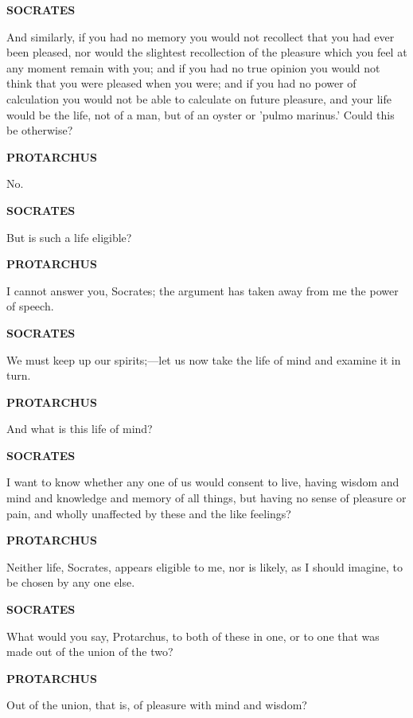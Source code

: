 \documentclass[11pt,letter]{article}
\begin{document}
\par \textbf{SOCRATES}
\par   And similarly, if you had no memory you would not recollect that you had ever been pleased, nor would the slightest recollection of the pleasure which you feel at any moment remain with you; and if you had no true opinion you would not think that you were pleased when you were; and if you had no power of calculation you would not be able to calculate on future pleasure, and your life would be the life, not of a man, but of an oyster or 'pulmo marinus.' Could this be otherwise?

\par \textbf{PROTARCHUS}
\par   No.

\par \textbf{SOCRATES}
\par   But is such a life eligible?

\par \textbf{PROTARCHUS}
\par   I cannot answer you, Socrates; the argument has taken away from me the power of speech.

\par \textbf{SOCRATES}
\par   We must keep up our spirits;—let us now take the life of mind and examine it in turn.

\par \textbf{PROTARCHUS}
\par   And what is this life of mind?

\par \textbf{SOCRATES}
\par   I want to know whether any one of us would consent to live, having wisdom and mind and knowledge and memory of all things, but having no sense of pleasure or pain, and wholly unaffected by these and the like feelings?

\par \textbf{PROTARCHUS}
\par   Neither life, Socrates, appears eligible to me, nor is likely, as I should imagine, to be chosen by any one else.

\par \textbf{SOCRATES}
\par   What would you say, Protarchus, to both of these in one, or to one that was made out of the union of the two?

\par \textbf{PROTARCHUS}
\par   Out of the union, that is, of pleasure with mind and wisdom?
\end{document}
